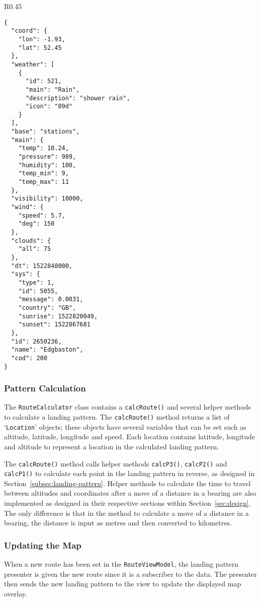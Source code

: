 \begin{wrapfigure}{R}{0.45\textwidth}
  \begin{verbatim}
{
  "coord": {
    "lon": -1.93,
    "lat": 52.45
  },
  "weather": [
    {
      "id": 521,
      "main": "Rain",
      "description": "shower rain",
      "icon": "09d"
    }
  ],
  "base": "stations",
  "main": {
    "temp": 10.24,
    "pressure": 989,
    "humidity": 100,
    "temp_min": 9,
    "temp_max": 11
  },
  "visibility": 10000,
  "wind": {
    "speed": 5.7,
    "deg": 150
  },
  "clouds": {
    "all": 75
  },
  "dt": 1522848000,
  "sys": {
    "type": 1,
    "id": 5055,
    "message": 0.0031,
    "country": "GB",
    "sunrise": 1522820049,
    "sunset": 1522867681
  },
  "id": 2650236,
  "name": "Edgbaston",
  "cod": 200
}
  \end{verbatim}
  \label{lst:json-response}
\end{wrapfigure}

\subsubsection{Pattern Calculation}\label{subsubsec:pattern-calculation}
The \texttt{RouteCalculator} class contains a \texttt{calcRoute()} and several helper methods to calculate a landing pattern. The \texttt{calcRoute()} method returns a list of `\texttt{Location}' objects; these objects have several variables that can be set such as altitude, latitude, longitude and speed. Each location contains latitude, longitude and altitude to represent a location in the calculated landing pattern.

The \texttt{calcRoute()} method calls helper methods \texttt{calcP3()}, \texttt{calcP2()} and \texttt{calcP1()} to calculate each point in the landing pattern in reverse, as designed in Section~\ref{subsec:landing-pattern}. Helper methods to calculate the time to travel between altitudes and coordinates after a move of a distance in a bearing are also implemented as designed in their respective sections within Section~\ref{sec:design}. The only difference is that in the method to calculate a move of a distance in a bearing, the distance is input as metres and then converted to kilometres.

\subsubsection{Updating the Map}
When a new route has been set in the \texttt{RouteViewModel}, the landing pattern presenter is given the new route since it is a subscriber to the data. The presenter then sends the new landing pattern to the view to update the displayed map overlay.

